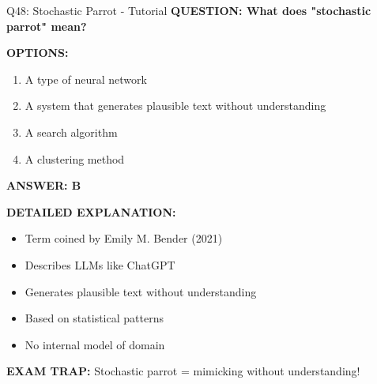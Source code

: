 \documentclass[8pt]{beamer}
\begin{document}
	\begin{frame}{Q48: Stochastic Parrot - Tutorial}
		\fontsize{6.5}{7.5}\selectfont
		\textbf{QUESTION: What does "stochastic parrot" mean?}
		
		\vspace{0.1cm}
		\textbf{OPTIONS:}
		\begin{enumerate}
			\item A type of neural network
			\item A system that generates plausible text without understanding
			\item A search algorithm
			\item A clustering method
		\end{enumerate}
		
		\vspace{0.1cm}
		\textcolor{myblue}{\textbf{ANSWER: B}}
		
		\vspace{0.1cm}
		\textbf{DETAILED EXPLANATION:}
		\begin{itemize}
			\item Term coined by Emily M. Bender (2021)
			\item Describes LLMs like ChatGPT
			\item Generates plausible text without understanding
			\item Based on statistical patterns
			\item No internal model of domain
		\end{itemize}
		
		\vspace{0.1cm}
		\textcolor{myred}{\textbf{EXAM TRAP:}} Stochastic parrot = \textcolor{myblue}{mimicking without understanding}!
	\end{frame}
	
\end{document}
